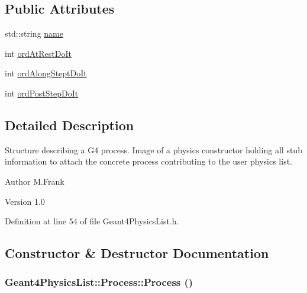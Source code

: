 \subsection*{Public Attributes}
\begin{DoxyCompactItemize}
\item 
std::string \hyperlink{class_d_d4hep_1_1_simulation_1_1_geant4_physics_list_1_1_process_a215e1b0b76f9da5783f191129c1abf0d}{name}
\item 
int \hyperlink{class_d_d4hep_1_1_simulation_1_1_geant4_physics_list_1_1_process_ab2954e7c39774a2eefc0891b8b5cf000}{ordAtRestDoIt}
\item 
int \hyperlink{class_d_d4hep_1_1_simulation_1_1_geant4_physics_list_1_1_process_a392bb771bc353a55146a63793868fdd9}{ordAlongSteptDoIt}
\item 
int \hyperlink{class_d_d4hep_1_1_simulation_1_1_geant4_physics_list_1_1_process_a5c1ea6f1d3867ef4c1c0a74c7d16783b}{ordPostStepDoIt}
\end{DoxyCompactItemize}


\subsection{Detailed Description}
Structure describing a G4 process. Image of a physics constructor holding all stub information to attach the concrete process contributing to the user physics list.

\begin{DoxyAuthor}{Author}
M.Frank 
\end{DoxyAuthor}
\begin{DoxyVersion}{Version}
1.0 
\end{DoxyVersion}


Definition at line 54 of file Geant4PhysicsList.h.

\subsection{Constructor \& Destructor Documentation}
\hypertarget{class_d_d4hep_1_1_simulation_1_1_geant4_physics_list_1_1_process_ac8ddef52a1287d02acdb83b769ee8c94}{
\subsubsection[{Process}]{\setlength{\rightskip}{0pt plus 5cm}Geant4PhysicsList::Process::Process ()}}
\label{class_d_d4hep_1_1_simulation_1_1_geant4_physics_list_1_1_process_ac8ddef52a1287d02acdb83b769ee8c94}


